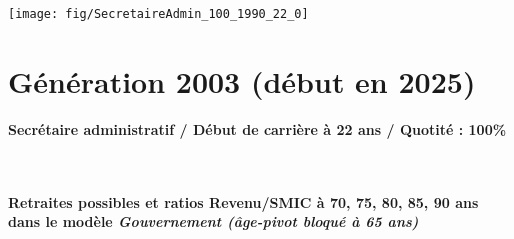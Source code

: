  \vspace{0.1cm} 

 {\hspace{-2.2cm}\texttt{[image: fig/SecretaireAdmin\_100\_1990\_22\_0]}} 

\newpage 
 
\section{Génération 2003 (début en 2025)\label{SecretaireAdmin_100_2003_22_0}} 
 
{\bf \noindent Secrétaire administratif / Début de carrière à 22 ans / Quotité : 100\%}  ~ 

 ~\\{\bf \noindent Retraites possibles et ratios Revenu/SMIC à 70, 75, 80, 85, 90 ans dans le modèle \emph{Gouvernement (âge-pivot bloqué à 65 ans)}}  
 
